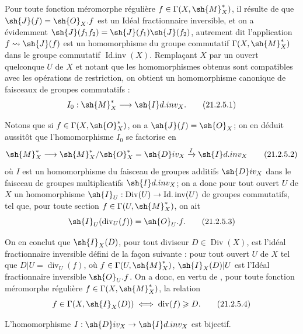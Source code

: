 \begin{env}[21.2.5]
\label{IV.21.2.5}
Pour toute fonction méromorphe régulière $f\in\Gamma(X,\sh{M}_X^*)$, il résulte de  que $\sh{J}(f)=\sh{O}_X.f$ est un Idéal fractionnaire inversible, et on a évidemment $\sh{J}(f_1f_2)=\sh{J}(f_1)\sh{J}(f_2)$, autrement dit l'application $f\leadsto\sh{J}(f)$ est un homomorphisme du groupe commutatif $\Gamma(X,\sh{M}_X^*)$ dans le groupe commutatif $\operatorname{Id.inv}(X)$.
Remplaçant $X$ par un ouvert quelconque $U$ de $X$ et notant que les homomorphismes obtenus sont compatibles avec les opérations de restriction, on obtient un homomorphisme canonique de faisceaux de groupes commutatifs :
\[
\label{IV.21.2.5.1}
  I_0:\sh{M}_X^*\to\sh{I}d.inv_X.
  \tag{21.2.5.1}
\]

Notons que si $f\in\Gamma(X,\sh{O}_X^*)$, on a $\sh{J}(f)=\sh{O}_X$;
on en déduit aussitôt que l'homomorphisme $I_0$ se factorise en
\[
\label{IV.21.2.5.2}
  \sh{M}_X^*\to\sh{M}_X^*/\sh{O}_X^*=\sh{D}iv_X\xrightarrow{I}\sh{I}d.inv_X
  \tag{21.2.5.2}
\]
où $I$ est un homomorphisme du faisceau de groupes additifs $\sh{D}iv_X$ dans le faisceau de groupes multiplicatifs $\sh{I}d.inv_X$;
on a donc pour tout ouvert $U$ de $X$ un homomorphisme $\sh{I}_U:\operatorname{Div}(U)\to\operatorname{Id.inv}(U)$ de groupes commutatifs, tel que, pour toute section $f\in\Gamma(U,\sh{M}_X^*)$, on ait
\[
\label{IV.21.2.5.3}
  \sh{I}_U(\operatorname{div}_U(f))=\sh{O}_U.f.
  \tag{21.2.5.3}
\]


On en conclut que $\sh{I}_X(D)$, pour tout diviseur $D\in\operatorname{Div}(X)$, est l'idéal fractionnaire inversible défini de la façon suivante : pour tout ouvert $U$ de $X$ tel que $D|U=\operatorname{div}_U(f)$, où $f\in\Gamma(U,\sh{M}_X^*)$, $\sh{I}_X(D)|U$ est l'Idéal fractionnaire inversible $\sh{O}_U.f$.
On a donc, en vertu de , pour toute fonction méromorphe régulière $f\in\Gamma(X,\sh{M}_X^*)$, la relation
\[
\label{IV.21.2.5.4}
  f\in\Gamma(X,\sh{I}_X(D)) \iff \operatorname{div}(f)\geq D.
  \tag{21.2.5.4}
\]
\end{env}

\begin{proposition}[21.2.6]
\label{IV.21.2.6}
L'homomorphisme $I:\sh{D}iv_X\to\sh{I}d.inv_X$ est bijectif.
\end{proposition}

